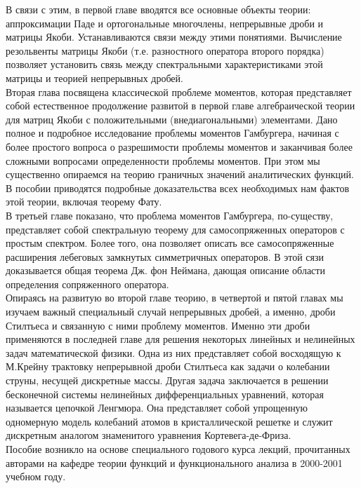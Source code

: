 \documentclass[12pt,a4paper]{article}
\theoremstyle{plain}   \newtheorem{Pro}{Задача}
\begin{document}
В связи с этим, в первой главе вводятся все основные объекты
теории: аппроксимации Паде и ортогональные многочлены, непрерывные
дроби и матрицы Якоби. Устанавливаются связи между этими понятиями.
Вычисление резольвенты матрицы Якоби (т.е. разностного оператора
второго порядка) позволяет установить связь между спектральными
характеристиками этой матрицы и теорией непрерывных дробей. \\

Вторая глава посвящена классической проблеме моментов, которая
представляет собой естественное продолжение развитой в первой
главе алгебраической теории для матриц Якоби с положительными
(внедиагональными) элементами.
Дано полное и подробное исследование проблемы моментов Гамбургера,
начиная с более простого вопроса о разрешимости проблемы моментов
и заканчивая более сложными вопросами определенности проблемы моментов.
При этом мы существенно опираемся на теорию граничных значений
аналитических функций. В пособии приводятся подробные доказательства
всех необходимых нам фактов этой теории, включая теорему Фату. \\

В третьей главе показано, что проблема моментов Гамбургера,
по-существу, представляет собой спектральную теорему для самосопряженных
операторов с простым спектром. Более того, она позволяет описать
все самосопряженные расширения лебеговых замкнутых симметричных
операторов. В этой сязи доказывается общая теорема Дж. фон Неймана,
дающая описание области определения сопряженного оператора. \\

Опираясь на развитую во второй главе теорию, в четвертой и
пятой главах мы изучаем
важный специальный случай непрерывных дробей, а именно, дроби
Стилтьеса и связанную с ними проблему моментов.
Именно эти дроби применяются в последней главе для решения
некоторых линейных и нелинейных задач математической физики.
Одна из них представляет собой восходящую к М.Крейну трактовку
непрерывной дроби Стилтьеса как задачи о колебании струны,
несущей дискретные массы.
Другая задача заключается в решении бесконечной системы нелинейных
дифференциальных уравнений, которая называется цепочкой Ленгмюра.
Она представляет собой упрощенную одномерную модель колебаний
атомов в кристаллической решетке и служит дискретным аналогом
знаменитого уравнения Кортевега-де-Фриза. \\

Пособие возникло на основе специального годового курса лекций,
прочитанных авторами на кафедре теории функций и функционального
анализа в 2000-2001 учебном году. \\
\end{document}
